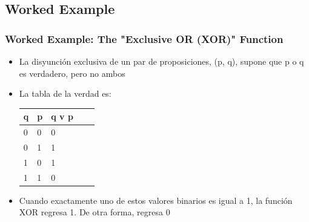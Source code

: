 \documentclass[
  shownotes,
  xcolor={svgnames},
  hyperref={colorlinks,citecolor=DarkBlue,linkcolor=DarkRed,urlcolor=DarkBlue}
  , aspectratio=169]{beamer}
\begin{document}
\subsection{Worked Example}
\begin{frame}
\frametitle{Worked Example: The "Exclusive OR (XOR)" Function}
\begin{itemize}
\item La disyunción exclusiva de un par de proposiciones, (p, q), supone que p o q es verdadero, pero no ambos
\item La tabla de la verdad es:

\begin{table}[H]
\begin{tabular}{lllll}
q  & p & q v p \\
\hline
0 & 0 & 0 \\
0 & 1 & 1 \\
1 & 0 & 1 \\
1 & 1 & 0 \\
\end{tabular}
\end{table}
\item Cuando exactamente uno de estos valores binarios es igual a 1, la función XOR 
regresa 1. De otra forma, regresa 0
\end{itemize}

\end{frame}
\end{document}
